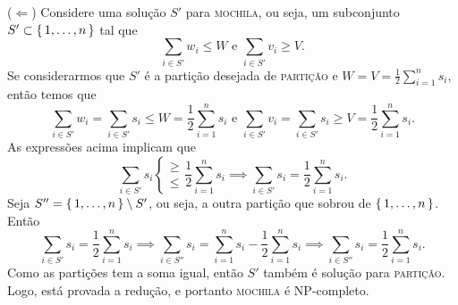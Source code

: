 \documentclass{article}
\begin{document}
($\Leftarrow$) Considere uma solução $S'$ para \textsc{mochila}, ou seja, um subconjunto $S' \subset \set{1,\dots, n}$ tal que
\[ \sum_{i \in S'}w_i \leq W \mbox{ e } \sum_{i \in S'}v_i \geq V .\]
Se considerarmos que $S'$ é a partição desejada de \textsc{partição} e $W = V = \frac{1}{2}\sum_{i=1}^n s_i$, então temos que
\[ \sum_{i \in S'}w_i = \sum_{i \in S'}s_i \leq W = \frac{1}{2}\sum_{i=1}^n s_i \mbox{ e }\sum_{i \in S'}v_i = \sum_{i \in S'}s_i \geq V = \frac{1}{2}\sum_{i=1}^n s_i .\]
As expressões acima implicam que
\[ \sum_{i \in S'}s_i \begin{cases}\geq \\ \leq \end{cases}  \frac{1}{2}\sum_{i=1}^n s_i \implies \sum_{i \in S'}s_i = \frac{1}{2}\sum_{i=1}^n s_i .\]
Seja $S'' = \set{1,\dots, n} \setminus S'$, ou seja, a outra partição que sobrou de $\set{1,\dots,n}$. Então
\[ \sum_{i \in S'}s_i = \frac{1}{2}\sum_{i=1}^n s_i
\implies \sum_{i \in S''}s_i = \sum_{i=1}^n s_i - \frac{1}{2}\sum_{i=1}^n s_i
\implies \sum_{i \in S''}s_i = \frac{1}{2}\sum_{i=1}^n s_i . \]
Como as partições tem a soma igual, então $S'$ também é solução para \textsc{partição}.
Logo, está provada a redução, e portanto \textsc{mochila} é NP-completo.
\end{document}
